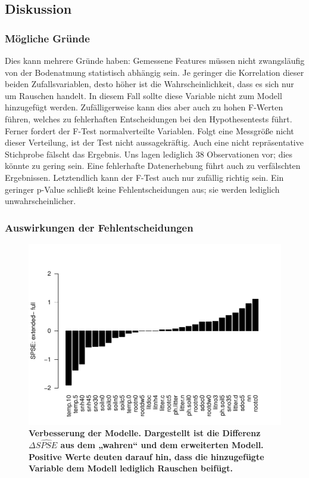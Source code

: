 \subsection{Diskussion}

\subsubsection{Mögliche Gründe}
Dies kann mehrere Gründe haben:
Gemessene Features müssen nicht zwangsläufig von der Bodenatmung statistisch abhängig sein.
Je geringer die Korrelation dieser beiden Zufallsvariablen, desto höher ist die Wahrscheinlichkeit, dass es sich nur um Rauschen handelt.
In diesem Fall sollte diese Variable nicht zum Modell hinzugefügt werden.
Zufälligerweise kann dies aber auch zu hohen F-Werten führen, welches zu fehlerhaften Entscheidungen bei den Hypothesentests führt.
Ferner fordert der F-Test normalverteilte Variablen.
Folgt eine Messgröße nicht dieser Verteilung, ist der Test nicht aussagekräftig.
Auch eine nicht repräsentative Stichprobe fälscht das Ergebnis.
Uns lagen lediglich 38 Observationen vor; dies könnte zu gering sein.
Eine fehlerhafte Datenerhebung führt auch zu verfälschten Ergebnissen.
Letztendlich kann der F-Test auch nur zufällig richtig sein.
Ein geringer p-Value schließt keine Fehlentscheidungen aus; sie werden lediglich unwahrscheinlicher.

\subsubsection{Auswirkungen der Fehlentscheidungen}

\begin{figure}[htbp]
	\centering
	\includegraphics[width=\textwidth]{fig/simul/delta-spse.pdf}
	\caption{\bf{Verbesserung der Modelle.} 
		Dargestellt ist die Differenz $\Delta \widehat{SPSE}$ aus dem „wahren“ und dem erweiterten Modell.
		Positive Werte deuten darauf hin, dass die hinzugefügte Variable dem Modell lediglich Rauschen beifügt.
	}
	\label{fig-simul-delta-spse}
\end{figure}
